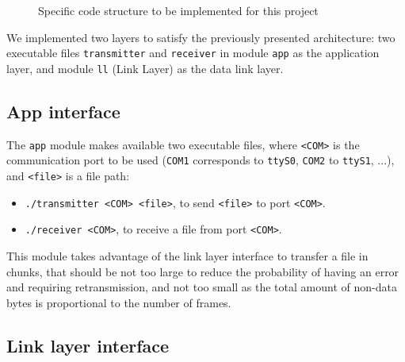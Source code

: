 \documentclass[a4paper, 11pt]{report}
\begin{document}
\begin{figure}[H]
	\caption{Specific code structure to be implemented for this project}
\end{figure}

We implemented two layers to satisfy the previously presented architecture: two executable files \texttt{transmitter} and \texttt{receiver} in module \texttt{app} as the application layer, and module \texttt{ll} (Link Layer) as the data link layer.

\subsection{App interface}

The \texttt{app} module makes available two executable files, where \texttt{<COM>} is the communication port to be used (\texttt{COM1} corresponds to \texttt{ttyS0}, \texttt{COM2} to \texttt{ttyS1}, ...), and \texttt{<file>} is a file path:
\begin{itemize}
	\item \texttt{./transmitter <COM> <file>}, to send \texttt{<file>} to port \texttt{<COM>}.
	\item \texttt{./receiver <COM>}, to receive a file from port \texttt{<COM>}.
\end{itemize}

This module takes advantage of the link layer interface to transfer a file in chunks, that should be not too large to reduce the probability of having an error and requiring retransmission, and not too small as the total amount of non-data bytes is proportional to the number of frames.


\subsection{Link layer interface}
\end{document}
